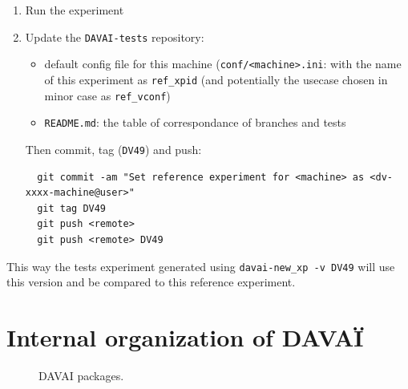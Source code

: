 \documentclass[a4paper,10pt,twoside]{article}
\begin{document}
\begin{appendix}
\begin{enumerate}[label=\arabic*),start=0]
\begin{itemize}
 \end{itemize}
 \item Run the experiment
 \item Update the \texttt{DAVAI-tests} repository:
 \begin{itemize}
  \item default config file for this machine (\texttt{conf/<machine>.ini}: with the name of this experiment as \texttt{ref\_xpid} (and potentially the usecase chosen in minor case as \texttt{ref\_vconf})
  \item \texttt{README.md}: the table of correspondance of branches and tests
 \end{itemize}
 Then commit, tag (\texttt{DV49}) and push:
 \begin{verbatim}
  git commit -am "Set reference experiment for <machine> as <dv-xxxx-machine@user>"
  git tag DV49
  git push <remote>
  git push <remote> DV49
 \end{verbatim}
\end{enumerate}

\noindent This way the tests experiment generated using \texttt{davai-new\_xp -v DV49} will use this version and be compared to this reference experiment.








\newpage
\section{Internal organization of DAVAÏ}

\begin{figure}[h!]\hspace{-2cm}
 \begin{center}\hspace{-2cm}
 \end{center}
 \caption{\label{fig:davai_ecosystem} DAVAI packages.}
\end{figure}



\end{appendix}
\end{document}
